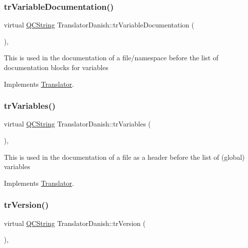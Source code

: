 \subsubsection{\texorpdfstring{trVariableDocumentation()}{trVariableDocumentation()}}
{\footnotesize\ttfamily virtual \mbox{\hyperlink{class_q_c_string}{Q\+C\+String}} Translator\+Danish\+::tr\+Variable\+Documentation (\begin{DoxyParamCaption}{ }\end{DoxyParamCaption})\hspace{0.3cm}{\ttfamily [inline]}, {\ttfamily [virtual]}}

This is used in the documentation of a file/namespace before the list of documentation blocks for variables 

Implements \mbox{\hyperlink{class_translator}{Translator}}.

\mbox{\label{class_translator_danish_a9cf5b54f0fd396d56eefece30a584721}} 
\subsubsection{\texorpdfstring{trVariables()}{trVariables()}}
{\footnotesize\ttfamily virtual \mbox{\hyperlink{class_q_c_string}{Q\+C\+String}} Translator\+Danish\+::tr\+Variables (\begin{DoxyParamCaption}{ }\end{DoxyParamCaption})\hspace{0.3cm}{\ttfamily [inline]}, {\ttfamily [virtual]}}

This is used in the documentation of a file as a header before the list of (global) variables 

Implements \mbox{\hyperlink{class_translator}{Translator}}.

\mbox{\label{class_translator_danish_a3ec30a802881bcce47cc7cefc233579a}} 
\subsubsection{\texorpdfstring{trVersion()}{trVersion()}}
{\footnotesize\ttfamily virtual \mbox{\hyperlink{class_q_c_string}{Q\+C\+String}} Translator\+Danish\+::tr\+Version (\begin{DoxyParamCaption}{ }\end{DoxyParamCaption})\hspace{0.3cm}{\ttfamily [inline]}, {\ttfamily [virtual]}}

